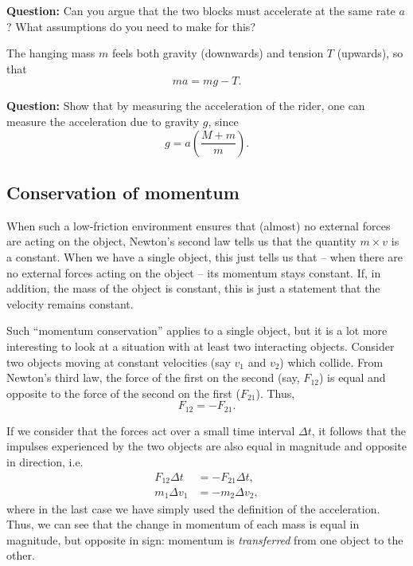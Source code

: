 \begin{question}
\textbf{Question:} Can you argue that the two blocks must accelerate at the same rate $a$? What assumptions do you need to make for this?
\end{question}

The hanging mass $m$ feels both gravity (downwards) and tension $T$ (upwards), so that
\begin{equation}
m a = mg - T.
\end{equation}

\begin{question}
\textbf{Question:} Show that by measuring the acceleration of the rider, one can measure the acceleration due to gravity $g$, since
\begin{equation}
g = a \left(\frac{M+m}{m}\right).
\end{equation}
\end{question}

\subsection*{Conservation of momentum}

When such a low-friction environment ensures that (almost) no external forces are acting on the object, Newton's second law tells us that the quantity $m\times v$ is a constant. When we have a single object, this just tells us that -- when there are no external forces acting on the object -- its momentum stays constant. If, in addition, the mass of the object is constant, this is just a statement that the velocity remains constant.

Such ``momentum conservation'' applies to a single object, but it is a lot more interesting to look at a situation with at least two interacting objects. Consider two objects moving at constant velocities (say $v_1$ and $v_2$) which collide. From Newton's third law, the force of the first on the second (say, $F_{12}$) is equal and opposite to the force of the second on the first ($F_{21}$). Thus,
\begin{equation}
F_{12} = - F_{21}.
\end{equation}

If we consider that the forces act over a small time interval $\Delta t$, it follows that the impulses experienced by the two objects are also equal in magnitude and opposite in direction, i.e.\ 
\begin{equation}
\begin{aligned}
 F_{12} \Delta t &= - F_{21} \Delta t,\\
 m_1 \Delta v_1 &= - m_2 \Delta v_2,
 \end{aligned}
\end{equation}
where in the last case we have simply used the definition of the acceleration. Thus, we can see that the change in momentum of each mass is equal in magnitude, but opposite in sign: momentum is \textsl{transferred} from one object to the other.

